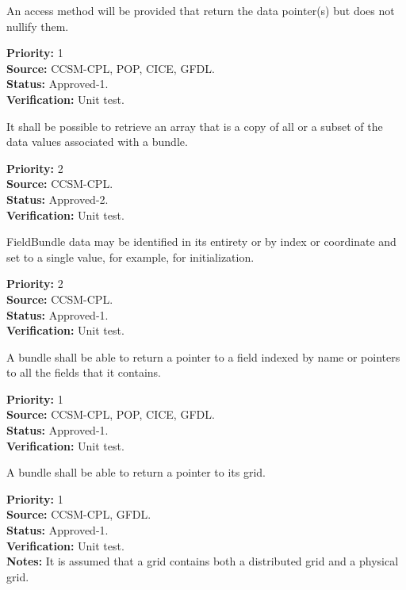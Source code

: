 An access method will be provided that return the data pointer(s) but does
not nullify them.
\begin{reqlist}
{\bf Priority:} 1\\
{\bf Source:} CCSM-CPL, POP, CICE, GFDL. \\ 
{\bf Status:} Approved-1. \\
{\bf Verification:} Unit test. 
\end{reqlist}

It shall be possible to retrieve an array that is a copy of all or
a subset of the data values associated with a bundle.
\begin{reqlist}
{\bf Priority:} 2 \\
{\bf Source:} CCSM-CPL. \\
{\bf Status:} Approved-2. \\
{\bf Verification:} Unit test. 
\end{reqlist}

FieldBundle data may be identified in its entirety or by index or coordinate and
set to a single value, for example, for initialization.
\begin{reqlist}
{\bf Priority:} 2 \\
{\bf Source:} CCSM-CPL. \\
{\bf Status:} Approved-1. \\
{\bf Verification:} Unit test. \\
\end{reqlist}

A bundle shall be able to return a pointer to a field indexed by name
or pointers to all the fields that it contains.
\begin{reqlist}
{\bf Priority:} 1\\
{\bf Source:} CCSM-CPL, POP, CICE, GFDL. \\
{\bf Status:} Approved-1. \\
{\bf Verification:} Unit test. 
\end{reqlist}

A bundle shall be able to return a pointer to its grid.
\begin{reqlist}
{\bf Priority:} 1\\
{\bf Source:} CCSM-CPL, GFDL. \\
{\bf Status:} Approved-1. \\
{\bf Verification:} Unit test. \\
{\bf Notes:} It is assumed that a grid contains both a distributed grid and
a physical grid.
\end{reqlist}

